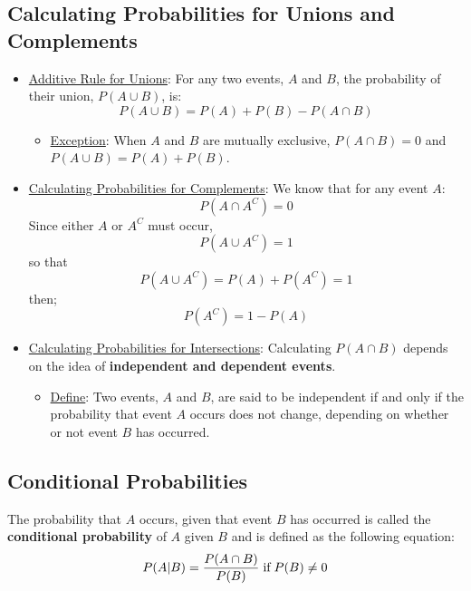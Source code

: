 \documentclass[12pt, letterpaper]{article}
\begin{document}
        \subsection{Calculating Probabilities for Unions and Complements}
            \begin{itemize}
                \item \underline{Additive Rule for Unions}: For any two events, $A$ and $B$, the probability of their union, $P(A\cup B)$, is: \smallskip
                    \begin{equation}
                        P(A\cup B) = P(A) + P(B) - P(A\cap B)
                    \end{equation}
                    \begin{itemize}
                        \item \underline{Exception}: When $A$ and $B$ are mutually exclusive, $P(A\cap B) = 0$ and \\$P(A\cup B) = P(A) + P(B)$.
                    \end{itemize}
                \item \underline{Calculating Probabilities for Complements}: We know that for any event $A$: $$P(A\cap A^C) = 0$$ Since either $A$ or $A^C$ must occur, $$P(A\cup A^C) = 1$$ so that $$P(A\cup A^C) = P(A) + P(A^C) = 1$$ then; \smallskip
                    \begin{equation}
                        P(A^C) = 1 - P(A)
                    \end{equation}
                \item \underline{Calculating Probabilities for Intersections}: Calculating $P(A\cap B)$ depends on the idea of \textbf{independent and dependent events}.
                    \begin{itemize}
                        \item \underline{Define}: Two events, $A$ and $B$, are said to be independent if and only if the probability that event $A$ occurs does not change, depending on whether or not event $B$ has occurred.
                    \end{itemize}
            \end{itemize}
        \subsection{Conditional Probabilities}
            The probability that $A$ occurs, given that event $B$ has occurred is called the \textbf{conditional probability} of $A$ given $B$ and is defined as the following equation: \smallskip
            \begin{equation}
                P(A|B) = \frac{P(A\cap B)}{P(B)} \hspace{1mm} \textnormal{if} \hspace{1mm} P(B) \neq 0
            \end{equation}
\end{document}
